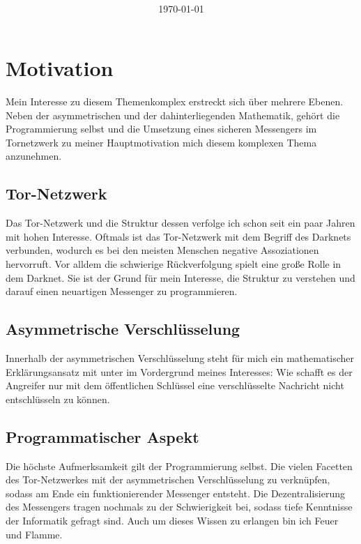 \documentclass[a4paper,10pt,ngerman,
  headheight=28pt,]{scrartcl}
\title{\textbf{\Huge\Titel}}
\author{\LARGE \Author \\\\}
\author{\LARGE \School \\\\}
\date{\LARGE\today}
\begin{document}
\maketitle
\tableofcontents
\setcounter{page}{0}

\vspace{0.5cm}
\pagebreak

\linenumbers
\modulolinenumbers[5]

\section{Motivation}
Mein Interesse zu diesem Themenkomplex erstreckt sich über mehrere Ebenen. Neben der asymmetrischen und der dahinterliegenden Mathematik, gehört die Programmierung selbst und die Umsetzung eines sicheren Messengers im Tornetzwerk zu meiner Hauptmotivation mich diesem komplexen Thema anzunehmen.
\subsection{Tor-Netzwerk}
Das Tor-Netzwerk und die Struktur dessen verfolge ich schon seit ein paar Jahren mit hohen Interesse. Oftmals ist das Tor-Netzwerk mit dem Begriff des Darknets verbunden, wodurch es bei den meisten Menschen negative Assoziationen hervorruft. Vor alldem die schwierige Rückverfolgung spielt eine große Rolle in dem Darknet. Sie ist der Grund für mein Interesse, die Struktur zu verstehen und darauf einen neuartigen Messenger zu programmieren.

\subsection{Asymmetrische Verschlüsselung}
Innerhalb der asymmetrischen Verschlüsselung steht für mich ein mathematischer Erklärungsansatz mit unter im Vordergrund meines Interesses: \glqq Wie schafft es der Angreifer nur mit dem öffentlichen Schlüssel eine verschlüsselte Nachricht nicht entschlüsseln zu können\grqq.

\subsection{Programmatischer Aspekt}
Die höchste Aufmerksamkeit gilt der Programmierung selbst. Die vielen Facetten des Tor-Netzwerkes mit der asymmetrischen Verschlüsselung zu verknüpfen, sodass am Ende ein funktionierender Messenger entsteht. Die Dezentralisierung des Messengers tragen nochmals zu der Schwierigkeit bei, sodass tiefe Kenntnisse der Informatik gefragt sind. Auch um dieses Wissen zu erlangen bin ich Feuer und Flamme.
\end{document}
